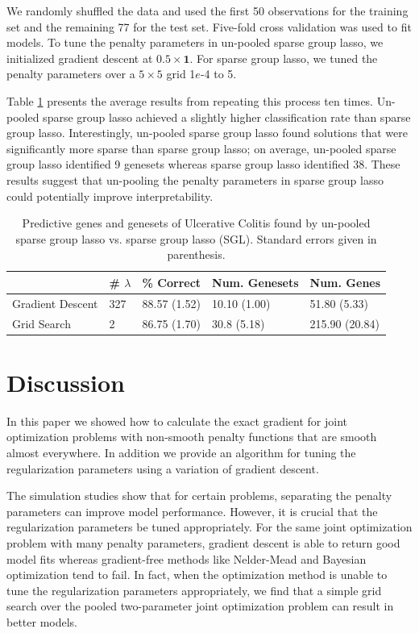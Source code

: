 \documentclass[12pt]{article}
\begin{document}
We randomly shuffled the data and used the first 50 observations for the training set and the remaining 77 for the test set. Five-fold cross validation was used to fit models. To tune the penalty parameters in un-pooled sparse group lasso, we initialized gradient descent at $0.5 \times \boldsymbol 1$. For sparse group lasso, we tuned the penalty parameters over a $5 \times 5$ grid 1$e$-4 to 5.

Table \ref{colitis} presents the average results from repeating this process ten times. Un-pooled sparse group lasso achieved a slightly higher classification rate than sparse group lasso. Interestingly, un-pooled sparse group lasso found solutions that were significantly more sparse than sparse group lasso; on average, un-pooled sparse group lasso identified 9 genesets whereas sparse group lasso identified 38. These results suggest that un-pooling the penalty parameters in sparse group lasso could potentially improve interpretability.

\begin{table}
\caption{\label{colitis} Predictive genes and genesets of Ulcerative Colitis found by un-pooled sparse group lasso vs. sparse group lasso (SGL). Standard errors given in parenthesis.}
\centering
\begin{tabular}{| l | l | l | l | l | }
\hline
& \# $\lambda$ & \% Correct  & Num. Genesets & Num. Genes  \\
\hline
Gradient Descent & 327 & 88.57 (1.52) & 10.10 (1.00) & 51.80 (5.33) \\
\hline
Grid Search & 2 & 86.75 (1.70) & 30.8 (5.18) & 215.90 (20.84) \\
\hline
\end{tabular}
\end{table}

\section{Discussion}
In this paper we showed how to calculate the exact gradient for joint optimization problems with non-smooth penalty functions that are smooth almost everywhere. In addition we provide an algorithm for tuning the regularization parameters using a variation of gradient descent. 

The simulation studies show that for certain problems, separating the penalty parameters can improve model performance. However, it is crucial that the regularization parameters be tuned appropriately. For the same joint optimization problem with many penalty parameters, gradient descent is able to return good model fits whereas gradient-free methods like Nelder-Mead and Bayesian optimization tend to fail. In fact, when the optimization method is unable to tune the regularization parameters appropriately, we find that a simple grid search over the pooled two-parameter joint optimization problem can result in better models.
\end{document}
